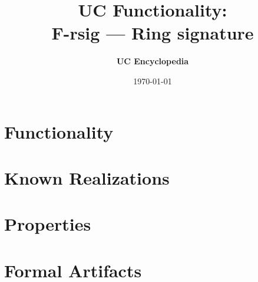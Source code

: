 \documentclass[11pt,a4paper]{article}
\title{\textbf{\Large UC Functionality:}\\[0.2em] \Large F-rsig --- Ring signature}
\author{\textbf{UC Encyclopedia}}
\date{\today}
\newtheorem{functionality}{Functionality}
\begin{document}
\maketitle

\begin{abstract}
\end{abstract}

\section{Functionality}

%

\section{Known Realizations}


\section{Properties}


\section{Formal Artifacts}

\end{document}
